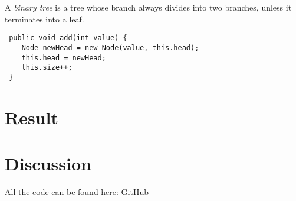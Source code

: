 \documentclass[a4paper,11pt]{article}
\newenvironment{code}{\captionsetup{type=listing}}{}
\begin{document}
A \textit{binary tree} is a tree whose branch always divides into two branches, unless it terminates
into a leaf.

\begin{code}
    \label{code:add}
    \begin{verbatim}
 public void add(int value) {
    Node newHead = new Node(value, this.head);
    this.head = newHead;
    this.size++;
 }
\end{verbatim}
\end{code}


\section*{Result}

\section*{Discussion}

All the code can be found here: \href{https://github.com/adrian-jonsson-sjoedin/ID1021-AlgoData/tree/main/Tasks/LinkedLists/src}{GitHub}
\end{document}
